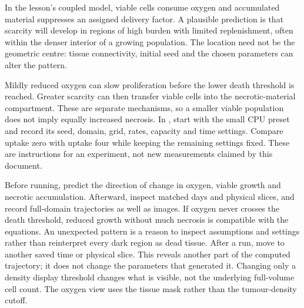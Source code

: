 \biomedicalanswer
{}
In the lesson's coupled model, viable cells consume oxygen and accumulated material suppresses an assigned delivery factor. A plausible prediction is that scarcity will develop in regions of high burden with limited replenishment, often within the denser interior of a growing population. The location need not be the geometric centre: tissue connectivity, initial seed and the chosen parameters can alter the pattern.

Mildly reduced oxygen can slow proliferation before the lower death threshold is reached. Greater scarcity can then transfer viable cells into the necrotic-material compartment. These are separate mechanisms, so a smaller viable population does not imply equally increased necrosis.
In , start with the small CPU preset and record its seed, domain, grid, rates, capacity and time settings. Compare uptake zero with uptake four while keeping the remaining settings fixed. These are instructions for an experiment, not new measurements claimed by this document.

Before running, predict the direction of change in oxygen, viable growth and necrotic accumulation. Afterward, inspect matched days and physical slices, and record full-domain trajectories as well as images. If oxygen never crosses the death threshold, reduced growth without much necrosis is compatible with the equations. An unexpected pattern is a reason to inspect assumptions and settings rather than reinterpret every dark region as dead tissue.
After a run, move to another saved time or physical slice. This reveals another part of the computed trajectory; it does not change the parameters that generated it. Changing only a density display threshold changes what is visible, not the underlying full-volume cell count. The oxygen view uses the tissue mask rather than the tumour-density cutoff.

